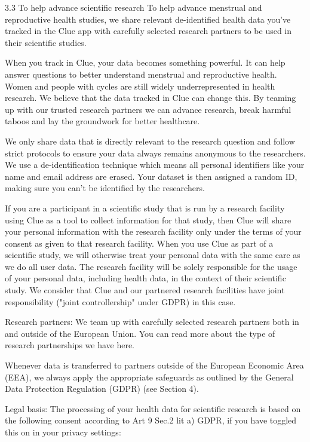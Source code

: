 3.3 To help advance scientific research
To help advance menstrual and reproductive health studies, we share relevant de-identified health data you’ve tracked in the Clue app with carefully selected research partners to be used in their scientific studies.

When you track in Clue, your data becomes something powerful. It can help answer questions to better understand menstrual and reproductive health. Women and people with cycles are still widely underrepresented in health research. We believe that the data tracked in Clue can change this. By teaming up with our trusted research partners we can advance research, break harmful taboos and lay the groundwork for better healthcare.

We only share data that is directly relevant to the research question and follow strict protocols to ensure your data always remains anonymous to the researchers. We use a de-identification technique which means all personal identifiers like your name and email address are erased. Your dataset is then assigned a random ID, making sure you can’t be identified by the researchers.

If you are a participant in a scientific study that is run by a research facility using Clue as a tool to collect information for that study, then Clue will share your personal information with the research facility only under the terms of your consent as given to that research facility. When you use Clue as part of a scientific study, we will otherwise treat your personal data with the same care as we do all user data. The research facility will be solely responsible for the usage of your personal data, including health data, in the context of their scientific study. We consider that Clue and our partnered research facilities have joint responsibility ("joint controllership" under GDPR) in this case.

Research partners: We team up with carefully selected research partners both in and outside of the European Union. You can read more about the type of research partnerships we have here.

Whenever data is transferred to partners outside of the European Economic Area (EEA), we always apply the appropriate safeguards as outlined by the General Data Protection Regulation (GDPR) (see Section 4).

Legal basis: The processing of your health data for scientific research is based on the following consent according to Art 9 Sec.2 lit a) GDPR, if you have toggled this on in your privacy settings:

